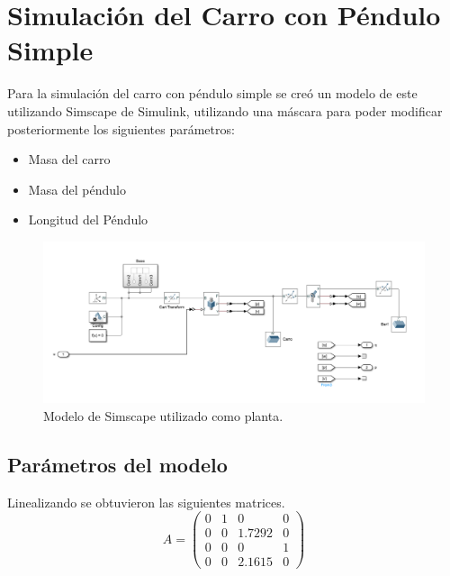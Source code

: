 







\tableofcontents
\newpage


\section{Simulación del Carro con Péndulo Simple}

Para la simulación del carro con péndulo simple se creó un modelo de este utilizando Simscape de Simulink, utilizando una máscara para poder modificar posteriormente los siguientes parámetros:

\begin{itemize}
\item Masa del carro
\item Masa del péndulo
\item Longitud del Péndulo
\end{itemize}

\begin{figure}[H]
	\centering
	\includegraphics[width=1\linewidth]{Imagenes/loopshaping/Simscape}
	\caption{Modelo de Simscape utilizado como planta.}
	\label{1_simscape}
\end{figure}

\subsection{Par\'ametros del modelo}
Linealizando se obtuvieron las siguientes matrices. 
\begin{equation*}
A = 
\begin{pmatrix}
0 &  1 & 0 & 0 \\
0 &  0 & 1.7292 & 0 \\
0  & 0 & 0 & 1  \\
0 &  0 & 2.1615 & 0 
\end{pmatrix}
\end{equation*}

